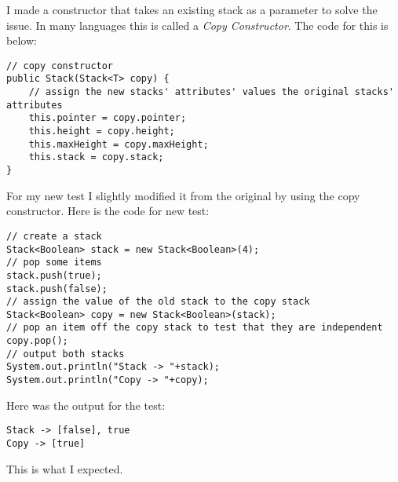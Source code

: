 \documentclass[../../../../main.tex]{subfiles}
\begin{document}
\newpage
\noindent
I made a constructor that takes an existing stack as a parameter to solve the issue. In many languages this is called a \textit{Copy Constructor}. The code for this is below:
\begin{verbatim}
// copy constructor
public Stack(Stack<T> copy) {
	// assign the new stacks' attributes' values the original stacks' attributes
	this.pointer = copy.pointer;
	this.height = copy.height;
	this.maxHeight = copy.maxHeight;
	this.stack = copy.stack;
}
\end{verbatim}
For my new test I slightly modified it from the original by using the copy constructor. Here is the code for new test:
\begin{verbatim}
// create a stack
Stack<Boolean> stack = new Stack<Boolean>(4);
// pop some items
stack.push(true);
stack.push(false);
// assign the value of the old stack to the copy stack 
Stack<Boolean> copy = new Stack<Boolean>(stack);
// pop an item off the copy stack to test that they are independent
copy.pop();
// output both stacks
System.out.println("Stack -> "+stack);
System.out.println("Copy -> "+copy);
\end{verbatim}
Here was the output for the test:
\begin{verbatim}
Stack -> [false], true
Copy -> [true]
\end{verbatim}
This is what I expected.
\newpage
\end{document}
